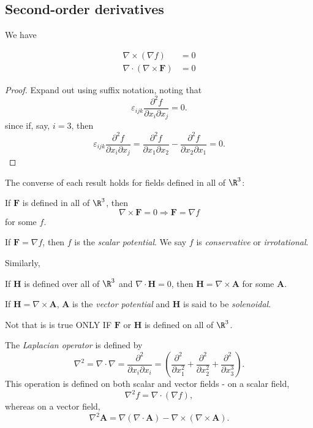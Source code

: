 \documentclass[a4paper]{article}
\begin{document}
\subsection{Second-order derivatives}
We have
\begin{prop}
  \begin{align*}
    \nabla\times (\nabla f) &= 0\\
    \nabla\cdot (\nabla\times \mathbf{F}) &=0
  \end{align*}
\end{prop}

\begin{proof}
  Expand out using suffix notation, noting that
  \[
    \varepsilon_{ijk}\frac{\partial^2 f}{\partial x_i \partial x_j} = 0.
  \]
  since if, say, $i = 3$, then
  \[
    \varepsilon_{ijk}\frac{\partial^2 f}{\partial x_i \partial x_j} = \frac{\partial^2 f}{\partial x_1 \partial x_2} - \frac{\partial^2 f}{\partial x_2 \partial x_1} = 0.
  \]

\end{proof}

The converse of each result holds for fields defined in all of $\R^3$:
\begin{prop}
  If $\mathbf{F}$ is defined in all of $\R^3$, then
  \[
    \nabla\times \mathbf{F} = 0 \Rightarrow  \mathbf{F} = \nabla f
  \]
  for some $f$.
\end{prop}

\begin{defi}
  If $\mathbf{F} = \nabla f$, then $f$ is the \emph{scalar potential}. We say $f$ is \emph{conservative} or \emph{irrotational}.
\end{defi}
Similarly,
\begin{prop}
  If $\mathbf{H}$ is defined over all of $\R^3$ and $\nabla\cdot \mathbf{H} = 0$, then $\mathbf{H} = \nabla \times \mathbf{A}$ for some $\mathbf{A}$.
\end{prop}

\begin{defi}
  If $\mathbf{H} = \nabla \times \mathbf{A}$, $\mathbf{A}$ is the \emph{vector potential} and $\mathbf{H}$ is said to be \emph{solenoidal}. 
\end{defi}

Not that is is true ONLY IF $\mathbf{F}$ or $\mathbf{H}$ is defined on all of $\R^3$.

\begin{defi}
  The \emph{Laplacian operator} is defined by
  \[
    \nabla^2 = \nabla\cdot \nabla = \frac{\partial^2}{\partial x_i \partial x_i} = \left(\frac{\partial^2}{\partial x_1^2} + \frac{\partial^2}{\partial x_2^2} + \frac{\partial^2}{\partial x_3^3}\right).
  \]
  This operation is defined on both scalar and vector fields - on a scalar field,
  \[
    \nabla^2 f = \nabla\cdot (\nabla f),
  \]
  whereas on a vector field,
  \[
    \nabla^2 \mathbf{A} = \nabla(\nabla\cdot \mathbf{A}) - \nabla\times (\nabla\times \mathbf{A}).
  \]
\end{defi}
\end{document}
